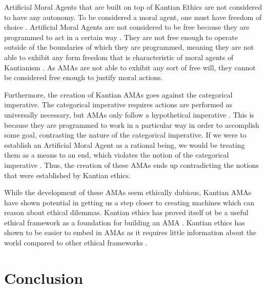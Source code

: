 \documentclass{article}
\begin{document}
Artificial Moral Agents that are built on top of Kantian Ethics are not considered to have
any autonomy. To be considered a moral agent, one must have freedom of choice \parencite[p. 141]{mannananth2021}. 
Artificial Moral Agents are not considered to be free because they are programmed to act in a certain way
\parencite[p. 429]{tonkens2009}. They are not free enough to operate outside of the boundaries of which they
are programmed, meaning they are not able to exhibit any form freedom that is characteristic of 
moral agents of Kantianism \parencite[p. 149]{mannananth2021}. As AMAs are not able to exhibit any
sort of free will, they cannot be considered free enough to justify moral actions.

Furthermore, the creation of Kantian AMAs goes against the categorical imperative. The categorical
imperative requires actions are performed as universally necessary, but AMAs only follow a hypothetical
imperative \parencite[p. 149]{mannananth2021}. This is because they are programmed to work in a particular way
in order to accomplish some goal, contrasting the nature of the categorical imperative. If we were to
establish an Artificial Moral Agent as a rational being, we would be treating them as a means to an end,
which violates the notion of the categorical imperative \parencite[p. 432]{tonkens2009}. Thus, the creation
of these AMAs ends up contradicting the notions that were established by Kantian ethics.

While the development of these AMAs seem ethically dubious, Kantian AMAs have shown potential in 
getting us a step closer to creating machines which can reason about ethical dilemmas. Kantian
ethics has proved itself ot be a useful ethical framework as a foundation for building 
an AMA \parencite[p. 3]{singh2022}. Kantian ethics has shown to be easier to embed in AMAs as
it requires little information about the world compared to other ethical frameworks \parencite[p. 17]{singh2022}.

\section{Conclusion}
\printbibliography[title={References}]
\end{document}
